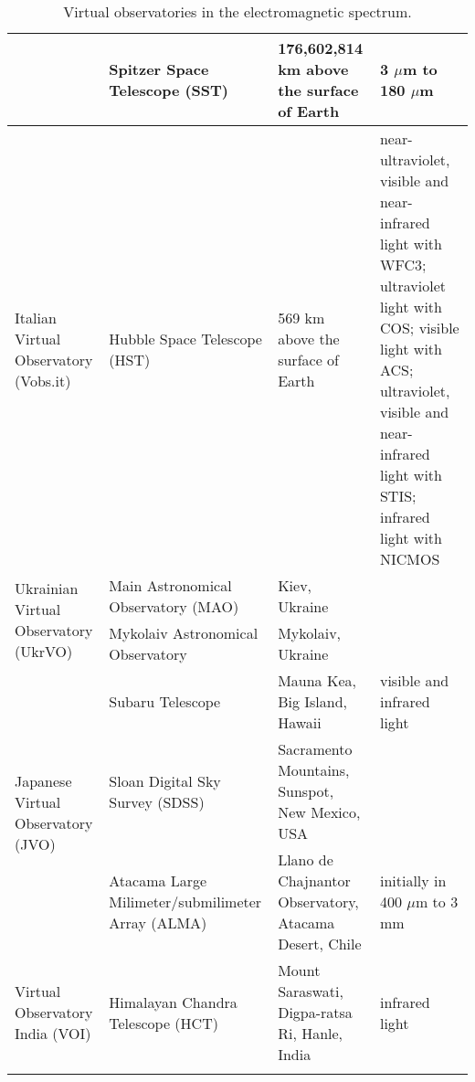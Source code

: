 \begin{center}
\begin{longtable}{|m{3cm}|m{3cm}|m{3cm}|m{5cm}|}
     \cline{2-4}
     & Spitzer Space Telescope (SST) & 176,602,814 km above the surface of Earth
     & 3 $ \mu $m to 180 $ \mu $m \\
    \hline
    Italian Virtual Observatory (Vobs.it) & Hubble Space Telescope (HST) & 569
    km above the surface of Earth & near-ultraviolet, visible and near-infrared
    light with WFC3; ultraviolet light with COS; visible light with ACS;
    ultraviolet, visible and near-infrared light with STIS; infrared light with
    NICMOS \\
    \hline
    \multirow{2}{3cm}{Ukrainian Virtual Observatory (UkrVO)} & Main Astronomical
    Observatory (MAO) & Kiev, Ukraine & \\
     \cline{2-4}
     & Mykolaiv Astronomical Observatory & Mykolaiv, Ukraine & \\
    \hline
    \multirow{3}{3cm}{Japanese Virtual Observatory (JVO)} & Subaru Telescope &
    Mauna Kea, Big Island, Hawaii & visible and infrared light \\
     \cline{2-4}
     & Sloan Digital Sky Survey (SDSS) & Sacramento Mountains, Sunspot, New
     Mexico, USA & \\
     \cline{2-4} 
     & Atacama Large Milimeter/submilimeter Array (ALMA) & Llano de Chajnantor
     Observatory, Atacama Desert, Chile & initially in 400 $ \mu $m to 3 mm \\
    \hline
    Virtual Observatory India (VOI) & Himalayan Chandra Telescope (HCT) & Mount
    Saraswati, Digpa-ratsa Ri, Hanle, India & infrared light \\
    \hline
\caption{Virtual observatories in the electromagnetic spectrum.}
\label{table:vo_EMS}
\end{longtable}
\end{center}
